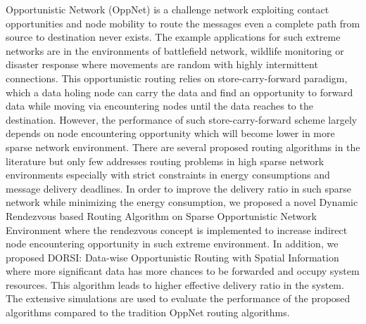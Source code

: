 %

Opportunistic Network (OppNet) is a challenge network exploiting contact opportunities and node mobility to route the messages even a complete path from source to destination never exists.
The example applications for such extreme networks are in the environments of battlefield network, wildlife monitoring or disaster response  where movements are random with highly intermittent connections. 
This opportunistic routing relies on store-carry-forward paradigm, which a data holing node can carry the data and find an opportunity to forward data while moving via encountering nodes until the data reaches to the destination.
However, the performance of such store-carry-forward scheme largely depends on node encountering opportunity which will become lower in more sparse network environment.
%
There are several proposed routing algorithms in the literature but only few addresses routing problems in high sparse network environments especially with strict constraints in energy consumptions and message delivery deadlines.
%
In order to improve the delivery ratio in such sparse network while minimizing the energy consumption, we proposed a novel Dynamic Rendezvous based Routing Algorithm on Sparse Opportunistic Network Environment where the rendezvous concept is implemented to increase indirect node encountering opportunity in such extreme environment.
In addition, we proposed DORSI: Data-wise Opportunistic Routing with Spatial Information where more significant data has more chances to be forwarded and occupy system resources.
%
This algorithm leads to higher effective delivery ratio in the system.
%
The extensive simulations are used to evaluate the performance of the proposed algorithms compared to the tradition OppNet routing algorithms.


